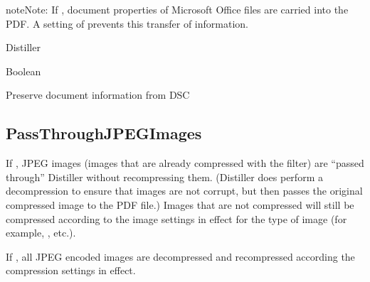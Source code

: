 \documentclass[letterpaper,12pt,english,openany,oneside]{sphinxmanual}
\begin{document}
\begin{sphinxadmonition}{note}{Note:}
If  , document properties of Microsoft Office files are carried into the PDF. A setting of  prevents this transfer of information.
\end{sphinxadmonition}
\label{\detokenize{PDF_Create_CommonSettings:supported-by-100}}

Distiller

\label{\detokenize{PDF_Create_CommonSettings:type-99}}

Boolean

\label{\detokenize{PDF_Create_CommonSettings:ui-name-82}}

Preserve document information from DSC

\label{\detokenize{PDF_Create_CommonSettings:default-value-94}}

\begin{sphinxVerbatim}[commandchars=\\\{\}]
\end{sphinxVerbatim}




\subsection{PassThroughJPEGImages}
\label{\detokenize{PDF_Create_CommonSettings:passthroughjpegimages}}
If  , JPEG images (images that are already compressed with the  filter) are “passed through” Distiller without re\sphinxhyphen{}compressing them. (Distiller does perform a decompression to ensure that images are not corrupt, but then passes the original compressed image to the PDF file.) Images that are not compressed will still be compressed according to the image settings in effect for the type of image (for example,  , etc.).

If  , all JPEG encoded images are decompressed and recompressed according the compression settings in effect.
\end{document}

